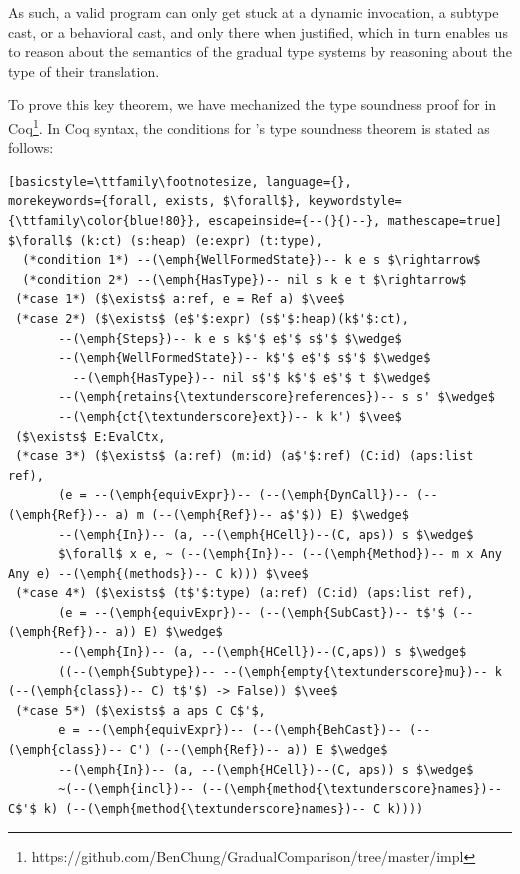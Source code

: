 \documentclass[a4paper,USenglish]{tex/lipics-v2016}
\begin{document}
As such, a valid \kafka program can only get stuck at a dynamic invocation, a
subtype cast, or a behavioral cast, and only there when justified, which in turn
enables us to reason about the semantics of the gradual type systems by reasoning
about the type of their \kafka translation.

To prove this key theorem, we have mechanized the type soundness proof for
\kafka in
Coq\footnote{https://github.com/BenChung/GradualComparison/tree/master/impl}.
In Coq syntax, the conditions for \kafka's type soundness theorem is stated as
follows:

\begin{lstlisting}[basicstyle=\ttfamily\footnotesize, language={}, 
morekeywords={forall, exists, $\forall$}, keywordstyle={\ttfamily\color{blue!80}}, escapeinside={--(}{)--}, mathescape=true]
$\forall$ (k:ct) (s:heap) (e:expr) (t:type),
  (*condition 1*) --(\emph{WellFormedState})-- k e s $\rightarrow$ 
  (*condition 2*) --(\emph{HasType})-- nil s k e t $\rightarrow$   
 (*case 1*) ($\exists$ a:ref, e = Ref a) $\vee$
 (*case 2*) ($\exists$ (e$'$:expr) (s$'$:heap)(k$'$:ct), 
       --(\emph{Steps})-- k e s k$'$ e$'$ s$'$ $\wedge$
       --(\emph{WellFormedState})-- k$'$ e$'$ s$'$ $\wedge$
	     --(\emph{HasType})-- nil s$'$ k$'$ e$'$ t $\wedge$
       --(\emph{retains{\textunderscore}references})-- s s' $\wedge$
       --(\emph{ct{\textunderscore}ext})-- k k') $\vee$
 ($\exists$ E:EvalCtx,
 (*case 3*) ($\exists$ (a:ref) (m:id) (a$'$:ref) (C:id) (aps:list ref),
       (e = --(\emph{equivExpr})-- (--(\emph{DynCall})-- (--(\emph{Ref})-- a) m (--(\emph{Ref})-- a$'$)) E) $\wedge$
       --(\emph{In})-- (a, --(\emph{HCell})--(C, aps)) s $\wedge$
       $\forall$ x e, ~ (--(\emph{In})-- (--(\emph{Method})-- m x Any Any e) --(\emph{(methods})-- C k))) $\vee$
 (*case 4*) ($\exists$ (t$'$:type) (a:ref) (C:id) (aps:list ref),
       (e = --(\emph{equivExpr})-- (--(\emph{SubCast})-- t$'$ (--(\emph{Ref})-- a)) E) $\wedge$
       --(\emph{In})-- (a, --(\emph{HCell})--(C,aps)) s $\wedge$
       ((--(\emph{Subtype})-- --(\emph{empty{\textunderscore}mu})-- k (--(\emph{class})-- C) t$'$) -> False)) $\vee$
 (*case 5*) ($\exists$ a aps C C$'$, 
       e = --(\emph{equivExpr})-- (--(\emph{BehCast})-- (--(\emph{class})-- C') (--(\emph{Ref})-- a)) E $\wedge$
       --(\emph{In})-- (a, --(\emph{HCell})--(C, aps)) s $\wedge$
       ~(--(\emph{incl})-- (--(\emph{method{\textunderscore}names})-- C$'$ k) (--(\emph{method{\textunderscore}names})-- C k))))
\end{lstlisting}
\end{document}

